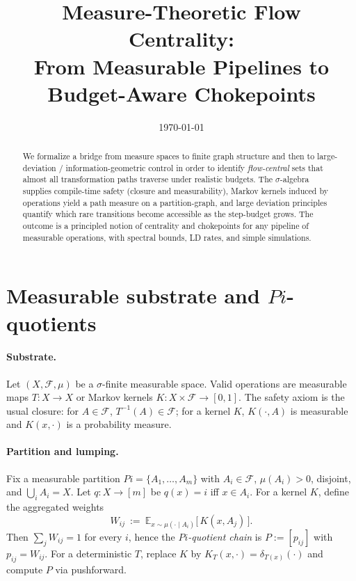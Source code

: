 \documentclass[11pt]{article}
\title{Measure-Theoretic Flow Centrality:\\
From Measurable Pipelines to Budget-Aware Chokepoints}
\author{}
\date{\today}
\def\Pi{Pi}%
\newcommand{\X}{X}
\newcommand{\F}{\mathcal F}
\newcommand{\EE}{\mathbb E}
\newcommand{\1}{\mathbbm{1}}
\theoremstyle{plain}
\theoremstyle{definition}
\begin{document}
\maketitle

\begin{abstract}
We formalize a bridge from measure spaces to finite graph structure and then to large-deviation / information-geometric control in order to identify \emph{flow-central} sets that almost all transformation paths traverse under realistic budgets. The $\sigma$-algebra supplies compile-time safety (closure and measurability), Markov kernels induced by operations yield a path measure on a partition-graph, and large deviation principles quantify which rare transitions become accessible as the step-budget grows. The outcome is a principled notion of centrality and chokepoints for any pipeline of measurable operations, with spectral bounds, LD rates, and simple simulations.
\end{abstract}

\section{Measurable substrate and \texorpdfstring{$\Pi$}{Pi}-quotients}
\label{sec:substrate}
\paragraph{Substrate.}
Let $(\X,\F,\mu)$ be a $\sigma$-finite measurable space. Valid operations are measurable maps $T:\X\to\X$ or Markov kernels $K:\X\times\F\to[0,1]$. The safety axiom is the usual closure: for $A\in\F$, $T^{-1}(A)\in\F$; for a kernel $K$, $K(\cdot,A)$ is measurable and $K(x,\cdot)$ is a probability measure.

\paragraph{Partition and lumping.}
Fix a measurable partition $\Pi=\{A_1,\ldots,A_m\}$ with $A_i\in\F$, $\mu(A_i)>0$, disjoint, and $\bigcup_iA_i=\X$. Let $q:\X\to[m]$ be $q(x)=i$ iff $x\in A_i$. For a kernel $K$, define the aggregated weights
\begin{equation}
\label{eq:W}
W_{ij}\ :=\ \EE_{x\sim \mu(\cdot\mid A_i)}\big[\,K(x,A_j)\,\big].
\end{equation}
Then $\sum_j W_{ij}=1$ for every $i$, hence the \emph{$\Pi$-quotient chain} is $P:=[p_{ij}]$ with $p_{ij}=W_{ij}$. For a deterministic $T$, replace $K$ by $K_T(x,\cdot)=\delta_{T(x)}(\cdot)$ and compute $P$ via pushforward.
\end{document}
